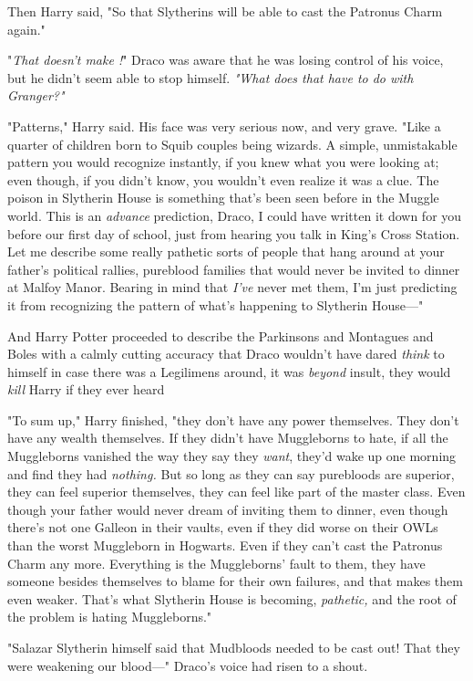 Then Harry said, "So that Slytherins will be able to cast the Patronus Charm
again."

"\emph{That{\el} doesn't{\el} make{\el} !}" Draco was aware that
he was losing control of his voice, but he didn't seem able to stop himself.
\emph{"What does that have to do with Granger?"}

"Patterns," Harry said. His face was very serious now, and very grave. "Like a
quarter of children born to Squib couples being wizards. A simple, unmistakable
pattern you would recognize instantly, if you knew what you were looking at;
even though, if you didn't know, you wouldn't even realize it was a clue. The
poison in Slytherin House is something that's been seen before in the Muggle
world. This is an \emph{advance} prediction, Draco, I could have written it
down for you before our first day of school, just from hearing you talk in
King's Cross Station. Let me describe some really pathetic sorts of people that
hang around at your father's political rallies, pureblood families that would
never be invited to dinner at Malfoy Manor. Bearing in mind that \emph{I've}
never met them, I'm just predicting it from recognizing the pattern of what's
happening to Slytherin House\mbox{---}"

And Harry Potter proceeded to describe the Parkinsons and Montagues and Boles
with a calmly cutting accuracy that Draco wouldn't have dared \emph{think} to
himself in case there was a Legilimens around, it was \emph{beyond} insult,
they would \emph{kill} Harry if they ever heard{\el}

"To sum up," Harry finished, "they don't have any power themselves. They don't
have any wealth themselves. If they didn't have Muggleborns to hate, if all the
Muggleborns vanished the way they say they \emph{want}, they'd wake up one
morning and find they had \emph{nothing.} But so long as they can say
purebloods are superior, they can feel superior themselves, they can feel like
part of the master class. Even though your father would never dream of inviting
them to dinner, even though there's not one Galleon in their vaults, even if
they did worse on their OWLs than the worst Muggleborn in Hogwarts. Even if
they can't cast the Patronus Charm any more. Everything is the Muggleborns'
fault to them, they have someone besides themselves to blame for their own
failures, and that makes them even weaker. That's what Slytherin House is
becoming, \emph{pathetic,} and the root of the problem is hating Muggleborns."

"Salazar Slytherin himself said that Mudbloods needed to be cast out! That they
were weakening our blood\mbox{---}" Draco's voice had risen to a shout.

